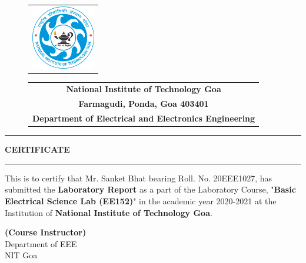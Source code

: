 \thispagestyle{empty}
\begin{figure}
    \begin{minipage}{4cm}
        \begin{tabular}{c}
            \includegraphics[height=2.8cm]{images/NIT_Goa_Logo.png} \\
        \end{tabular}
    \end{minipage}
    \begin{minipage}{7cm}
        \begin{tabular}{c}
            {\huge \textbf{National Institute of Technology Goa}}\vspace{0.5cm}     \\
            {\large \textbf{Farmagudi, Ponda, Goa 403401}}\vspace{0.5cm}            \\
            { \Large \textbf{Department of Electrical and Electronics Engineering}} \\
        \end{tabular}
    \end{minipage}
\end{figure}

\begin{center}
    \vspace{0.5cm}
    {\color{cyan}
        \hrule height 5pt}
    \vspace{0.5cm}
    {\Large \Large \textbf{CERTIFICATE}}
    \vspace{0.5cm}
    {\color{cyan}
        \hrule height 5pt}
\end{center}

\vspace{5cm}

\setlength{\baselineskip}{1.5cm}
{\Large This is to certify that Mr. Sanket Bhat  bearing Roll. No. 20EEE1027, has submitted the \textbf{Laboratory Report} as a part of the Laboratory Course, "\textbf{Basic Electrical Science Lab (EE152)}" in the academic year 2020-2021 at the Institution of \textbf{National Institute of Technology Goa}.}

\setlength{\baselineskip}{5mm}

\vspace{2cm}

\begin{flushright}
    \vspace{1.3cm}
    {\Large\textbf{(Course Instructor)}\\ Department of EEE\\ NIT Goa}
\end{flushright}

\pagebreak